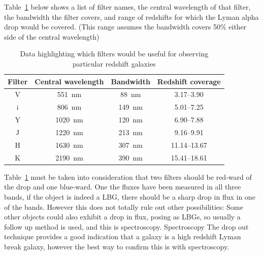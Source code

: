		Table~\ref{tab:filter_characteristics} below shows a list of filter names, the central wavelength of that filter, the bandwidth the filter covers, and range of redshifts for which the Lyman alpha drop would be covered. (This  range assumes the bandwidth covers 50\% either side of the central wavelength)
		\begin{table}[!htbp]
			\begin{center}
				\begin{tabular}{c|c|c|c}
					Filter 	& Central wavelength & Bandwidth & Redshift coverage \\
					\hline \hline
					V 	& \SI{551}{\nano\metre}	 & \SI{88}{\nano\metre} & 3.17--3.90 \\
					i 	& \SI{806}{\nano\metre}	 & \SI{149}{\nano\metre} & 5.01--7.25 \\
					Y 	& \SI{1020}{\nano\metre} & \SI{120}{\nano\metre} & 6.90--7.88 \\
					J 	& \SI{1220}{\nano\metre} & \SI{213}{\nano\metre} & 9.16--9.91 \\
					H 	& \SI{1630}{\nano\metre} & \SI{307}{\nano\metre} & 11.14--13.67 \\
					K 	& \SI{2190}{\nano\metre} & \SI{390}{\nano\metre} & 15.41--18.61
				\end{tabular}
			\end{center}
			\caption{Data highlighting which filters would be useful for observing particular redshift galaxies\cite{Galactic_Astronomy_Binney_Merrifield}}
			\label{tab:filter_characteristics}
		\end{table}

		Table~\ref{tab:filter_characteristics} must be taken into consideration that two filters should be red-ward of the drop and one blue-ward. One the fluxes have been measured in all three bands, if the object is indeed a LBG, there should be a sharp drop in flux in  one of the bands. However this does not totally rule out other possibilities: Some other objects could also exhibit a drop in flux, posing as LBGs, so usually a follow up method is used, and this is spectroscopy. Spectroscopy The drop out technique provides a good indication that a galaxy is a high redshift Lyman break galaxy, however the best way to confirm this is with spectroscopy.

